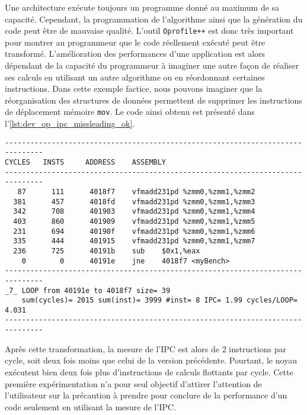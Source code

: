         Une architecture exécute toujours un programme donné au maximum de sa capacité. Cependant, la programmation de l'algorithme ainsi que la génération du code peut être de mauvaise qualité. L'outil \verb=Oprofile++= est donc très important pour montrer au programmeur que le code réellement exécuté peut être transformé. L'amélioration des performances d'une application est alors dépendant de la capacité du programmeur à imaginer une autre façon de réaliser ses calculs en utilisant un autre algorithme ou en réordonnant certaines instructions. Dans cette exemple factice, nous pouvons imaginer que la réorganisation des structures de données permettent de supprimer les instructions de déplacement mémoire \verb=mov=. Le code ainsi obtenu est présenté dans  l'\autoref{lst:dev_op_ipc_missleading_ok}. 
    
\begin{lstlisting}[label=lst:dev_op_ipc_missleading_ok, caption=Noyau de calcul exécutant deux opérations de calcul par cycle.]
-------------------------------------------------------------------------------
CYCLES   INSTS     ADDRESS    ASSEMBLY                         
-------------------------------------------------------------------------------
   87      111      4018f7    vfmadd231pd %zmm0,%zmm1,%zmm2
  381      457      4018fd    vfmadd231pd %zmm0,%zmm1,%zmm3
  342      708      401903    vfmadd231pd %zmm0,%zmm1,%zmm4
  403      860      401909    vfmadd231pd %zmm0,%zmm1,%zmm5
  231      694      40190f    vfmadd231pd %zmm0,%zmm1,%zmm6
  335      444      401915    vfmadd231pd %zmm0,%zmm1,%zmm7
  236      725      40191b    sub    $0x1,%eax
    0        0      40191e    jne    4018f7 <myBench>
-------------------------------------------------------------------------------
_7_ LOOP from 40191e to 4018f7 size= 39
    sum(cycles)= 2015 sum(inst)= 3999 #inst= 8 IPC= 1.99 cycles/LOOP= 4.031
-------------------------------------------------------------------------------
\end{lstlisting}

        Après cette transformation, la mesure de l'IPC est alors de 2 instructions par cycle, soit deux fois moins que celui de la version précédente. Pourtant, le noyau exécutent bien deux fois plus d'instructions de calculs flottants par cycle. Cette première expérimentation n'a pour seul objectif d'attirer l'attention de l'utilisateur sur la précaution à prendre pour conclure de la performance d'un code seulement en utilisant la mesure de l'IPC. 
        


